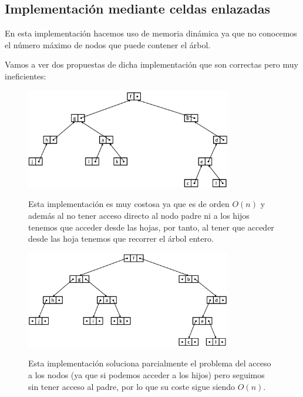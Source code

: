 \subsection{Implementación mediante celdas enlazadas}
En esta implementación hacemos uso de memoria dinámica ya que no conocemos el número máximo de nodos que puede contener el árbol.

Vamos a ver dos propuestas de dicha implementación que son correctas pero muy ineficientes:
\begin{figure}[h]
  \begin{minipage}{0.55\textwidth}
    \includegraphics[width=0.8\textwidth]{assets/ICE1.png}
  \end{minipage}
  \hfill
  \begin{minipage}{0.4\textwidth}
    Esta implementación es muy costosa ya que es de orden \(O (n)\) y además al no tener acceso directo al nodo padre ni a los hijos tenemos que acceder desde las hojas, por tanto, al tener que acceder desde las hoja tenemos que recorrer el árbol entero.
  \end{minipage}
\end{figure}

\begin{figure}[h]
  \begin{minipage}{0.55\textwidth}
    \includegraphics[width=0.8\textwidth]{assets/ICE2.png}
  \end{minipage}
  \hfill
  \begin{minipage}{0.4\textwidth}
    Esta implementación soluciona parcialmente el problema del acceso a los nodos (ya que si podemos acceder a los hijos) pero seguimos sin tener acceso al padre, por lo que su coste sigue siendo \(O (n)\).
  \end{minipage}
\end{figure}

